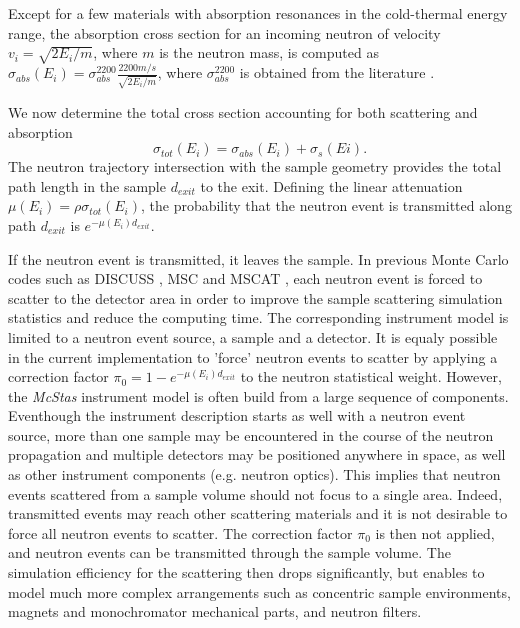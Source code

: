 Except for a few materials with absorption resonances in the cold-thermal energy range, the absorption cross section for an incoming neutron of velocity $v_i=\sqrt{2E_i/m}$, where $m$ is the neutron mass, is computed as
$\sigma_{abs}(E_i) = \sigma_{abs}^{\textrm{2200}}\frac{2200 m/s}{\sqrt{2E_i/m}}$, where $\sigma_{abs}^{\textrm{2200}}$ is obtained from the literature \cite{ILLblue}.

We now determine the total cross section accounting for both scattering and absorption
\begin{equation}
\sigma_{tot}(E_i) = \sigma_{abs}(E_i) + \sigma_s(Ei).
\end{equation}
The neutron trajectory intersection with the sample geometry provides the total path length in the sample $d_{exit}$ to the exit.
Defining the linear attenuation $\mu(E_i) = \rho\sigma_{tot}(E_i)$, the probability that the neutron event is transmitted along path $d_{exit}$ is $e^{-\mu(E_i) d_{exit}}$.

If the neutron event is transmitted, it leaves the sample. In previous Monte Carlo codes such as DISCUSS \cite{discus}, MSC \cite{msc} and MSCAT \cite{mscat}, each neutron event is forced to scatter to the detector area in order to improve the sample scattering simulation statistics and reduce the computing time. The corresponding instrument model is limited to a neutron event source, a sample and a detector. It is equaly possible in the current implementation to 'force' neutron events to scatter by applying a correction factor $\pi_0=1-e^{-\mu(E_i) d_{exit}}$ to the neutron statistical weight. However, the \emph{McStas} instrument model is often build from a large sequence of components. Eventhough the instrument description starts as well with a neutron event source, more than one sample may be encountered in the course of the neutron propagation and multiple detectors may be positioned anywhere in space, as well as other instrument components (e.g. neutron optics). This implies that neutron events scattered from a sample volume should not focus to a single area.  Indeed, transmitted events may reach other scattering materials and it is not desirable to force all neutron events to scatter. The correction factor $\pi_0$ is then not applied, and neutron events can be transmitted through the sample volume. The simulation efficiency for the scattering then drops significantly, but enables to model much more complex arrangements such as concentric sample environments, magnets and monochromator mechanical parts, and neutron filters.

